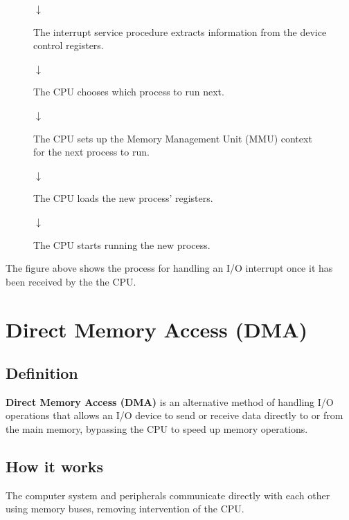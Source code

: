 \documentclass[a4paper]{systems-software}
\begin{document}
\begin{figure}[H]
{\begin{minipage}{\dimexpr \textwidth-2\fboxsep-2\fboxrule}
	$\downarrow$
	
	The interrupt service procedure extracts information from the device control registers.
	
	$\downarrow$
	
	The CPU chooses which process to run next.
	
	$\downarrow$
	
	The CPU sets up the Memory Management Unit (MMU) context for the next process to run.
	
	$\downarrow$
	
	The CPU loads the new process' registers.
	
	$\downarrow$
	
	The CPU starts running the new process.
  \end{minipage}}
\end{figure}

The figure above shows the process for handling an I/O interrupt once it has been received by the the CPU.


\section*{Direct Memory Access (DMA)}

\subsection*{Definition}

\textbf{Direct Memory Access (DMA)} is an alternative method of handling I/O operations that allows an I/O device to send or receive data directly to or from the main memory, bypassing the CPU to speed up memory operations.


\subsection*{How it works}

The computer system and peripherals communicate directly with each other using memory buses, removing intervention of the CPU.
\end{document}

